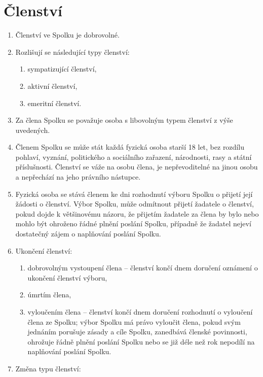 \documentclass[11pt,a4paper]{article}
\begin{document}
\section{Členství}
\begin{enumerate}[itemsep=0pt]
    \item Členství ve Spolku je dobrovolné.
    \item Rozlišují se následující typy členství:
    \begin{enumerate}[itemsep=0pt,topsep=0pt]
        \item sympatizující členství,
        \item aktivní členství,
	\item emeritní členství.
    \end{enumerate}
    \item Za člena Spolku se považuje osoba s libovolným typem členství z výše uvedených.
    \item Členem Spolku se může stát každá fyzická 
    osoba starší 18 let, bez rozdílu pohlaví, vyznání, politického a sociálního 
    zařazení, národnosti, rasy a státní příslušnosti. Členství se váže na osobu 
    člena, je nepřevoditelné na jinou osobu a nepřechází na jeho 
    právního nástupce. 
    \item Fyzická osoba se stává členem ke dni 
    rozhodnutí výboru Spolku o přijetí její žádosti o členství. Výbor Spolku, 
    může odmítnout přijetí žadatele o členství, pokud dojde k většinovému 
    názoru, že přijetím žadatele za člena by bylo nebo mohlo být ohroženo 
    řádné plnění poslání Spolku, případně že žadatel nejeví dostatečný zájem 
    o naplňování poslání Spolku.
    \item Ukončení členství:
    \begin{enumerate}[itemsep=0pt,topsep=0pt]
        \item dobrovolným vystoupení člena – členství končí dnem doručení 
        oznámení o ukončení členství výboru,
        \item úmrtím člena,
        \item vyloučením člena – členství končí dnem doručení rozhodnutí 
        o vyloučení člena ze Spolku; výbor Spolku má právo vyloučit člena, 
        pokud svým jednáním porušuje zásady a cíle Spolku, zanedbává členské 
        povinnosti, ohrožuje řádně plnění poslání Spolku nebo se již déle než 
        rok nepodílí na naplňování poslání Spolku.
    \end{enumerate}
    \item Změna typu členství:

\end{enumerate}
\end{document}
